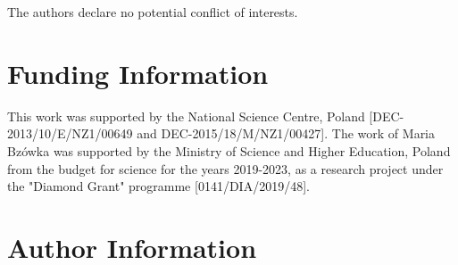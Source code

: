 \documentclass[9pt,tutorial]{livecoms}
\begin{document}
The authors declare no potential conflict of interests.

\section{Funding Information}
This work was supported by the National Science Centre, Poland [DEC-2013/10/E/NZ1/00649 and \newline DEC-2015/18/M/NZ1/00427]. \newline
The work of Maria Bzówka was supported by the Ministry of Science and Higher Education, Poland from the budget for science for the years 2019-2023, as a research project under the "Diamond Grant" programme [0141/DIA/2019/48].

\section*{Author Information}
\makeorcid




\end{document}
